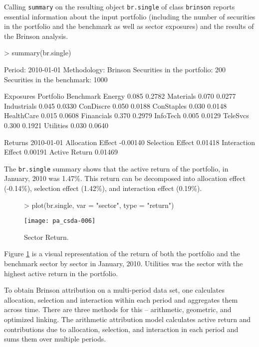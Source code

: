 Calling \texttt{summary} on the resulting object \texttt{br.single} of
class \texttt{brinson} reports essential information about the input
portfolio (including the number of securities in the portfolio and the
benchmark as well as sector exposures) and the results of the Brinson
analysis.

\begin{Schunk}
\begin{Sinput}
> summary(br.single)
\end{Sinput}
\begin{Soutput}
Period:                              2010-01-01
Methodology:                         Brinson
Securities in the portfolio:         200
Securities in the benchmark:         1000

Exposures 
            Portfolio Benchmark
Energy          0.085    0.2782
Materials       0.070    0.0277
Industrials     0.045    0.0330
ConDiscre       0.050    0.0188
ConStaples      0.030    0.0148
HealthCare      0.015    0.0608
Financials      0.370    0.2979
InfoTech        0.005    0.0129
TeleSvcs        0.300    0.1921
Utilities       0.030    0.0640

Returns 
                   2010-01-01
Allocation Effect    -0.00140
Selection Effect      0.01418
Interaction Effect    0.00191
Active Return         0.01469
\end{Soutput}
\end{Schunk}

The \texttt{br.single} summary shows that the active return of the
portfolio, in January, 2010 was 1.47\%. This return can be decomposed
into allocation effect (-0.14\%), selection effect (1.42\%), and
interaction effect (0.19\%).

\begin{figure}
\centering
\vspace*{.1in}
\begin{Schunk}
\begin{Sinput}
> plot(br.single, var = "sector", type = "return")
\end{Sinput}
\end{Schunk}
\texttt{[image: pa\_csda-006]}
\caption{\label{figure:return}
  Sector Return.}
\end{figure}

Figure \ref{figure:return} is a visual representation of the return of
both the portfolio and the benchmark sector by sector in January,
2010. Utilities was the
sector with the highest active return in the portfolio.

To obtain Brinson attribution on a multi-period data set, one
calculates allocation, selection and interaction within each period
and aggregates them across time. There are three methods for this --
arithmetic, geometric, and optimized linking. The arithmetic attribution model
calculates active return and contributions due to allocation,
selection, and interaction in each period and sums them over multiple
periods. 

